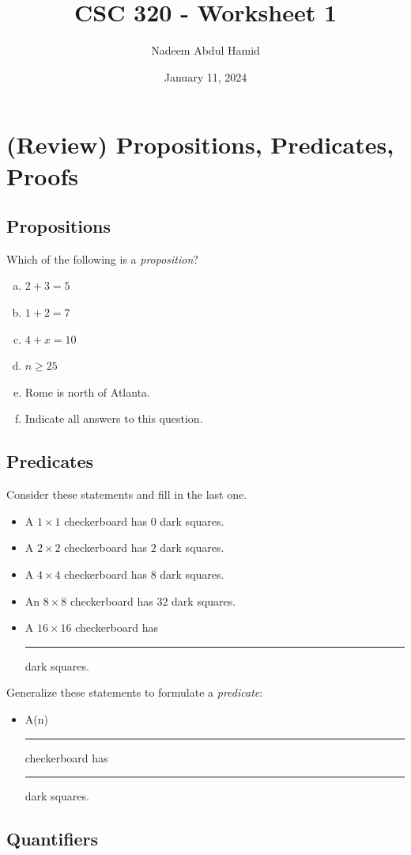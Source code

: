 \documentclass[12pt]{article}
\title{CSC 320 - Worksheet 1}
\author{Nadeem Abdul Hamid}
\date{January 11, 2024}
\begin{document}
\section{(Review) Propositions, Predicates, Proofs}
\subsection{Propositions}

Which of the following is a \emph{proposition}?

\begin{enumerate}[a.]
    \item $2 + 3 = 5$
    \item $1 + 2 = 7$
    \item $4 + x = 10$
    \item $n \geq 25$
    \item Rome is north of Atlanta.
    \item Indicate all answers to this question.
\end{enumerate}


\subsection{Predicates}
\label{sec:preds}

Consider these statements and fill in the last one.

\begin{itemize}
    \item A $1 \times 1$ checkerboard has $0$ dark squares.
    \item A $2 \times 2$ checkerboard has $2$ dark squares.
    \item A $4 \times 4$ checkerboard has $8$ dark squares.
    \item An $8 \times 8$ checkerboard has $32$ dark squares.
    \item A $16 \times 16$ checkerboard has \rule{2em}{0.4pt} dark squares.
\end{itemize}

Generalize these statements to formulate a \emph{predicate}:

\begin{itemize}
    \item A(n) \rule{7em}{0.4pt} checkerboard has \rule{5em}{0.4pt} dark squares.
\end{itemize}



\clearpage
\subsection{Quantifiers}
\end{document}

